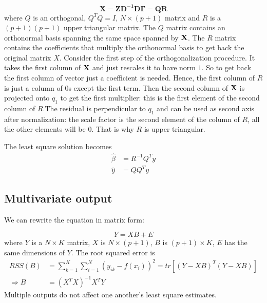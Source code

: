 \begin{equation}
\mathbf{X = ZD^{-1}D\Gamma = QR}
\end{equation}
where $Q$ is an orthogonal, $Q^TQ=I$, $ N\times(p+1)$ matrix and $R$ is a $(p+1)(p+1)$ upper triangular matrix. The $Q$ matrix contains an orthonormal basis spanning the same space spanned by $\mathrm{\mathbf{X}}$. The $R$ matrix contains the coefficients that multiply the orthonormal basis to get back the original matrix $X$. Consider the first step of the orthogonalization procedure. It takes the first column of $\mathrm{\mathbf{X}}$ and just rescales it to have norm $1$. So to get back the first column of vector just a coefficient is needed. Hence, the first column of $R$ is just a column of $0$s except the first term. Then the second column of $\mathrm{\mathbf{X}}$ is projected onto $q_1$ to get the first multiplier: this is the first element of the second column of $R$.The residual is perpendicular to $q_1$ and can be used as second axis after normalization: the scale factor is the second element of the column of $R$, all the other elements will be $0$. That is why $R$ is upper triangular.

The least square solution becomes 
\begin{equation}
\begin{aligned}
\hat{\beta} &= R^{-1}Q^Ty\\
\hat{y} &= QQ^Ty
\end{aligned}
\end{equation}

\subsection{Multivariate output}
We can rewrite the equation in matrix form:

\begin{equation}
Y = XB + E
\end{equation}
where $Y$ is  a $N\times K$ matrix, $X$ is $N\times(p+1)$, $B$ is $(p+1)\times K$, $E$ has the same dimensions of $Y$.
The root squared error is 
\begin{equation}
\begin{aligned}
RSS(B) &= \sum_{k=1}^K\sum_{i=1}^N\left(y_{ik}-f(x_i)\right)^2 = tr \left[  \left( Y-XB\right)^T\left( Y-XB\right) \right]	\\
\Rightarrow B &= \left( X^TX\right)^{-1}X^TY
\end{aligned}
\end{equation}
Multiple outputs do not affect one another's least square estimates.

